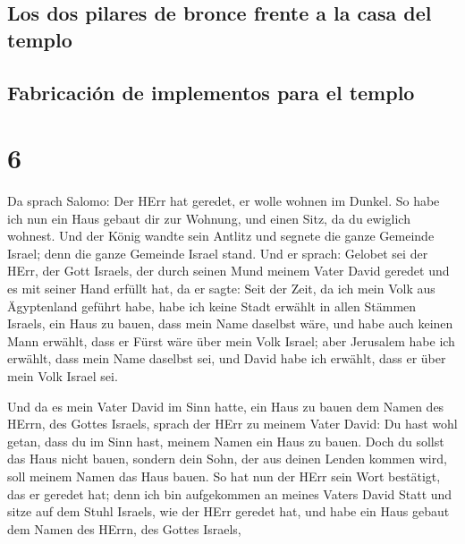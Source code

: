 \hypertarget{los-dos-pilares-de-bronce-frente-a-la-casa-del-templo}{%
\subsection{Los dos pilares de bronce frente a la casa del
templo}\label{los-dos-pilares-de-bronce-frente-a-la-casa-del-templo}}

\hypertarget{fabricaciuxf3n-de-implementos-para-el-templo}{%
\subsection{Fabricación de implementos para el
templo}\label{fabricaciuxf3n-de-implementos-para-el-templo}}

\hypertarget{section-5}{%
\section{6}\label{section-5}}

 Da sprach Salomo: Der HErr hat geredet, er wolle wohnen
im Dunkel.  So habe ich nun ein Haus gebaut dir zur
Wohnung, und einen Sitz, da du ewiglich wohnest.  Und der
König wandte sein Antlitz und segnete die ganze Gemeinde Israel; denn
die ganze Gemeinde Israel stand.  Und er sprach: Gelobet
sei der HErr, der Gott Israels, der durch seinen Mund meinem Vater David
geredet und es mit seiner Hand erfüllt hat, da er sagte: 
Seit der Zeit, da ich mein Volk aus Ägyptenland geführt habe, habe ich
keine Stadt erwählt in allen Stämmen Israels, ein Haus zu bauen, dass
mein Name daselbst wäre, und habe auch keinen Mann erwählt, dass er
Fürst wäre über mein Volk Israel;  aber Jerusalem habe ich
erwählt, dass mein Name daselbst sei, und David habe ich erwählt, dass
er über mein Volk Israel sei.

 Und da es mein Vater David im Sinn hatte, ein Haus zu
bauen dem Namen des HErrn, des Gottes Israels,  sprach der
HErr zu meinem Vater David: Du hast wohl getan, dass du im Sinn hast,
meinem Namen ein Haus zu bauen.  Doch du sollst das Haus
nicht bauen, sondern dein Sohn, der aus deinen Lenden kommen wird, soll
meinem Namen das Haus bauen.  So hat nun der HErr sein
Wort bestätigt, das er geredet hat; denn ich bin aufgekommen an meines
Vaters David Statt und sitze auf dem Stuhl Israels, wie der HErr geredet
hat, und habe ein Haus gebaut dem Namen des HErrn, des Gottes Israels,

